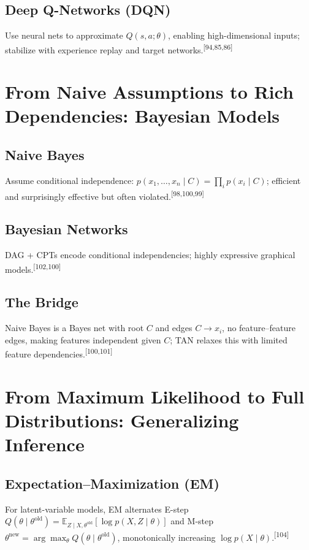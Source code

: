 \documentclass[11pt]{article}
\newcommand{\refnum}[1]{\textsuperscript{[#1]}}
\begin{document}
\subsection{Deep Q-Networks (DQN)}
Use neural nets to approximate $Q(s,a;\theta)$, enabling high-dimensional inputs; stabilize with experience replay and target networks.\refnum{94,85,86}

\section{From Naive Assumptions to Rich Dependencies: Bayesian Models}

\subsection{Naive Bayes}
Assume conditional independence: $p(x_1,\dots,x_n\mid C)=\prod_{i}p(x_i\mid C)$; efficient and surprisingly effective but often violated.\refnum{98,100,99}

\subsection{Bayesian Networks}
DAG + CPTs encode conditional independencies; highly expressive graphical models.\refnum{102,100}

\subsection{The Bridge}
Naive Bayes is a Bayes net with root $C$ and edges $C\to x_i$, no feature--feature edges, making features independent given $C$; TAN relaxes this with limited feature dependencies.\refnum{100,101}

\section{From Maximum Likelihood to Full Distributions: Generalizing Inference}

\subsection{Expectation--Maximization (EM)}
For latent-variable models, EM alternates
E-step $Q(\theta\mid\theta^{\text{old}})=\mathbb{E}_{Z\mid X,\theta^{\text{old}}}[\log p(X,Z\mid\theta)]$ and
M-step $\theta^{\text{new}}=\arg\max_\theta Q(\theta\mid\theta^{\text{old}})$, monotonically increasing $\log p(X\mid\theta)$.\refnum{104}
\end{document}
